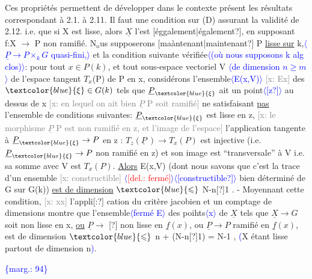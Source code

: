 \documentclass[11pt]{article}
\newcommand{\scanpage}[1]{\par\bigskip\noindent{\small\sffamily[scan #1]}\par}
\newcommand{\mspage}[1]{{\small\sffamily[p.\,#1]}}
\newcommand{\hand}[1]{\textcolor{blue}{#1}}
\let\over\relax
\newcommand{\over}[2]{\textcolor{gray}{#1}\textcolor{blue}{\ensuremath{^{\!\nearrow}}#2}}
\newcommand{\inserted}[2][]{\textcolor{blue}{$\langle$#2$\rangle$}}
\newcommand{\margin}[1]{\textcolor{blue}{\{\textsf{marg.:} #1\}}}
\newcommand{\deleted}[1]{\textcolor{red}{[\textsf{del.:} #1]}}
\newcommand{\xout}[1]{\textcolor{gray}{[\textsf{x:} #1]}}
\newcommand{\uline}[1]{\underline{#1}}
\newcommand{\unsure}[1]{[#1?]}
\begin{document}
Ces propriétés permettent de développer dans le contexte présent
les résultats correspondant à 2.1. à 2.11. Il faut une condition sur (D)
assurant la validité de 2.12. i.e. que si X est lisse, alors $\underline{X}$ l'est
\unsure{éggalement|également}, en supposant f:X $\longrightarrow$ P non ramifié. N$_{\mathrm{o}}$us supposerons
\unsure{maàntenant|maintenant} P \uline{lisse sur} k,\inserted{$\underline{P} \rightarrow P \times_k G$ quasi-fini,} et la condition suivante vérifiée\inserted[typed]{(où nous supposons k alg clos)}: pour
tout $x \in P(k)$, et tout sous-espace vectoriel V \inserted[typed]{de dimension $n \geqslant m$} de l'espace tangent
$T_x$(P) de P en x, considérons l'ensemble\inserted{E(x,V)} \xout{Ex} des $\hand{\xi} \in G(k)$ tels que
$\underline{P}_{\hand{\xi}}$ ait un point\inserted{\unsure{z}} au dessus de x \xout{en lequel on ait bien $\underline{P}$ P soit ramifié}
ne satisfaisant \uline{pas} l'ensemble de conditions suivantes: $\underline{P}_{\hand{\xi}}$ est lisse en
z, \xout{le morphisme $\underline{P}$ P est non ramifié en z, et l'image de l'espace}
l'application tangente à $\underline{P}_{\hand{\xi}} \rightarrow P$ en z : $T_z(\underline{P}\ ) \rightarrow T_x(P)$ est injective
(i.e. $\underline{P}_{\hand{\xi}} \rightarrow P$ non ramifié en z) et son image est ``transversale'' à V
i.e. sa somme avec V est $T_x(P)$. \uline{Alors} E(x,V) (dont nous savons que
c'est la trace d'un ensemble \xout{constructible} \inserted[typed]{\deleted{fermé}}\inserted{\unsure{constructible}} bien déterminé de G sur G(k))
\uline{est de dimension} $\hand{\leqslant}$ N-n\unsure{\over{+}{-}}1 . - Moyennant cette condition, \xout{xx} l'appli\unsure{:}
cation du critère jacobien et un comptage de dimensions montre que
l'ensemble\inserted{fermé E} des poihts\inserted{x} de $\underline{X}$ tels que $\underline{X} \longrightarrow G$ soit non lisse en x, \uline{ou}
$\underline{P} \longrightarrow$ \unsure{\over{G}{G}} non lisse en $\underline{f}(x)$, ou $\underline{P} \longrightarrow P$ ramifié en $\underline{f}(x)$, est de
dimension $\hand{\leqslant}$ n + (N-n\unsure{\over{+}{-}}1) = N-1 , \hand{(}X étant lisse partout de dimension n\hand{)}.

\margin{94}

\clearpage
\scanpage{25/95}
\mspage{89}
\end{document}
